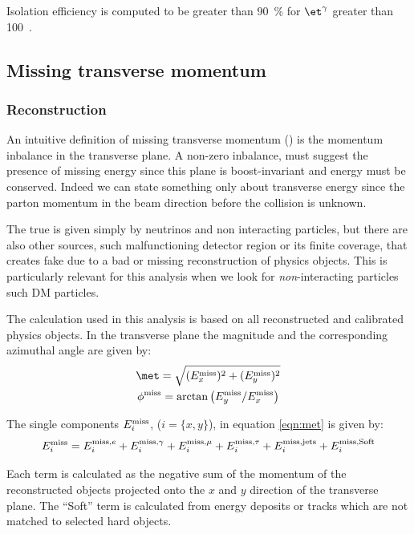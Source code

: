 Isolation efficiency is computed to be greater than \SI{90}{\percent} for $\et^\gamma$ greater than \SI{100}{\gev}~\cite{photonsISO}.

\subsection{Missing transverse momentum}
\label{sec:met}
\subsubsection{Reconstruction}

An intuitive definition of missing transverse momentum (\met) is the momentum inbalance in the transverse plane. A non-zero inbalance, must suggest the presence of missing energy since this plane is boost-invariant and energy must be conserved. Indeed we can state something only about transverse energy since the parton momentum in the beam direction before the collision is unknown.

The true \met is given simply by neutrinos and non interacting particles, but there are also other sources, such malfunctioning detector region or its finite coverage, that creates fake \met due to a bad or missing reconstruction of physics objects. This is particularly relevant for this analysis when we look for \emph{non}-interacting particles such DM particles.

The \met calculation used in this analysis is based on all reconstructed and calibrated physics objects. In the transverse plane the \met magnitude and the corresponding azimuthal angle are given by:
\begin{gather}
\label{eqn:met}
	\met=\sqrt{(E_x^\textup{miss})^2+(E_y^\textup{miss})^2}\\
	\phi^\textup{miss}=\arctan\big({E_y^\textup{miss}/E_x^\textup{miss}}\big)
\end{gather}

The single components $E_i^\textup{miss}$, ($i=\{x,y\}$), in equation \ref{eqn:met} is given by:
\begin{equation}
	E_i^\textup{miss}=E_i^\textup{miss,$e$}+E_i^\textup{miss,$\gamma$}+E_i^\textup{miss,$\mu$}+E_i^\textup{miss,$\tau$}+E_i^\textup{miss,jets}+E_i^\textup{miss,Soft}
\end{equation}

Each term is calculated as the negative sum of the momentum of the reconstructed objects projected onto the $x$ and $y$ direction of the transverse plane. The ``Soft'' term is calculated from energy deposits or tracks which are not matched to selected hard objects. 

